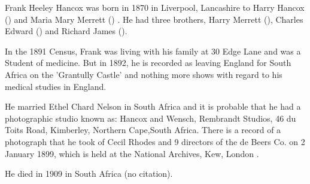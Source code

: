 
Frank Heeley Hancox was born in 1870 in Liverpool, Lancashire to Harry Hancox () and Maria Mary Merrett () \cite{FHHancoxBirth}. He had three brothers, Harry Merrett (), Charles Edward () and Richard James ().

In the 1891 Census, Frank was living with his family at 30 Edge Lane and was a Student of medicine.\cite{FrankHeeleyHancoxResidenceUK}  But in 1892, he is recorded as leaving England for South Africa on the 'Grantully Castle' \cite{FHHancoxTravel} and nothing more shows with regard to his medical studies in England. 

He married Ethel Chard Nelson in South Africa and it is probable that he had a photographic studio known as: Hancox and Wensch, Rembrandt Studios, 46 du Toits Road, Kimberley, Northern Cape,South Africa. There is a record of a photograph that he took of Cecil Rhodes and 9 directors of the de Beers Co. on 2 January 1899, which is held at the National Archives, Kew, London  \cite{FHHancoxPhotos}.

He died in 1909 in South Africa (no citation).
